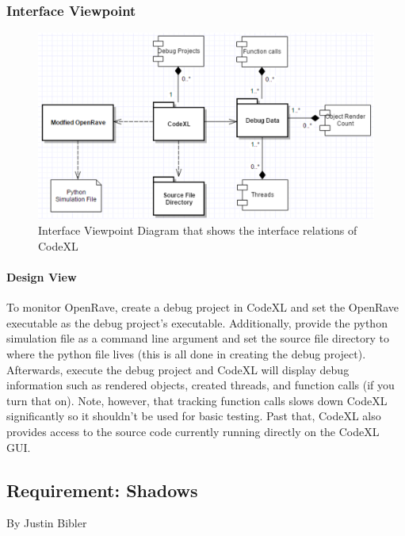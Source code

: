 \begin{flushleft}
\subsubsection{Interface Viewpoint}

\begin{figure} [H]
  \includegraphics[scale=0.9]{designdoc_v1/CodeXL_Interface.eps}
  \caption
{ \newline \hspace{\linewidth}
Interface Viewpoint Diagram that shows the interface relations of CodeXL}
  \label{fig:CodeXL_Interface}
\end{figure}

\paragraph{Design View}
To monitor OpenRave, create a debug project in CodeXL and set the OpenRave executable as the debug project's executable.
Additionally, provide the python simulation file as a command line argument and set the source file directory to where the python file lives (this is all done in creating the debug project).
Afterwards, execute the debug project and CodeXL will display debug information such as rendered objects, created threads, and function calls (if you turn that on).
Note, however, that tracking function calls slows down CodeXL significantly so it shouldn't be used for basic testing.
Past that, CodeXL also provides access to the source code currently running directly on the CodeXL GUI.

\newpage

\subsection{Requirement: Shadows}
\large{By Justin Bibler}


\end{flushleft}
